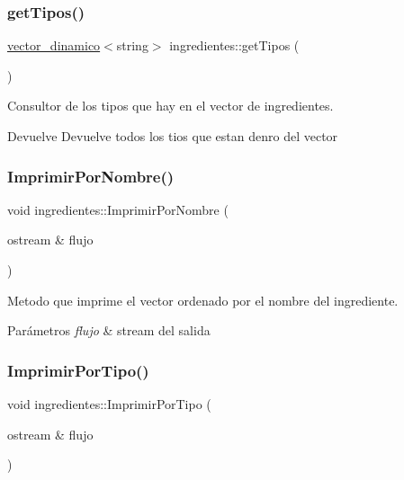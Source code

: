 \subsubsection{\texorpdfstring{get\+Tipos()}{getTipos()}}
{\footnotesize\ttfamily \hyperlink{classvector__dinamico}{vector\+\_\+dinamico}$<$string$>$ ingredientes\+::get\+Tipos (\begin{DoxyParamCaption}{ }\end{DoxyParamCaption})}



Consultor de los tipos que hay en el vector de ingredientes. 

\begin{DoxyReturn}{Devuelve}
Devuelve todos los tios que estan denro del vector 
\end{DoxyReturn}
\mbox{\label{classingredientes_adefafd151edf8a8997bca2dc22057ece}} 
\subsubsection{\texorpdfstring{Imprimir\+Por\+Nombre()}{ImprimirPorNombre()}}
{\footnotesize\ttfamily void ingredientes\+::\+Imprimir\+Por\+Nombre (\begin{DoxyParamCaption}\item[{ostream \&}]{flujo }\end{DoxyParamCaption})}



Metodo que imprime el vector ordenado por el nombre del ingrediente. 


\begin{DoxyParams}{Parámetros}
{\em flujo} & stream del salida \\
\hline
\end{DoxyParams}
\mbox{\label{classingredientes_a683d032576cbc230c210aa51cdbcc93e}} 
\subsubsection{\texorpdfstring{Imprimir\+Por\+Tipo()}{ImprimirPorTipo()}}
{\footnotesize\ttfamily void ingredientes\+::\+Imprimir\+Por\+Tipo (\begin{DoxyParamCaption}\item[{ostream \&}]{flujo }\end{DoxyParamCaption})}



